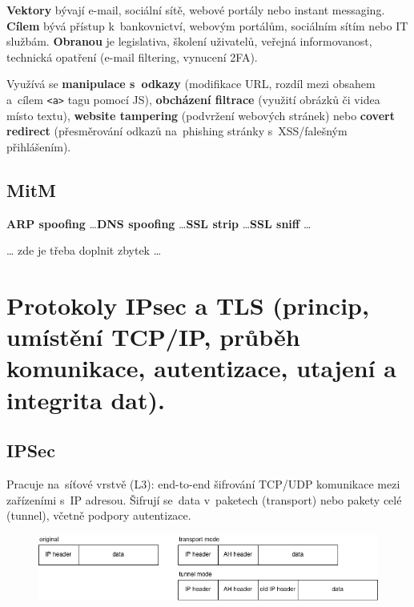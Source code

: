 \textbf{Vektory} bývají e-mail, sociální sítě, webové portály nebo instant messaging. \textbf{Cílem} bývá přístup k~bankovnictví, webovým portálům, sociálním sítím nebo IT službám. \textbf{Obranou} je legislativa, školení uživatelů, veřejná informovanost, technická opatření (e-mail filtering, vynucení 2FA).

Využívá se \textbf{manipulace s~odkazy} (modifikace URL, rozdíl mezi obsahem a~cílem \texttt{<a>} tagu pomocí JS), \textbf{obcházení filtrace} (využití obrázků či videa místo textu), \textbf{website tampering} (podvržení webových stránek) nebo \textbf{covert redirect} (přesměrování odkazů na~phishing stránky s~XSS/falešným přihlášením).

\subsection*{MitM}

\textbf{ARP spoofing} \dots \textbf{DNS spoofing} \dots \textbf{SSL strip} \dots \textbf{SSL sniff} \dots

\begin{center}
{\huge \dots} zde je třeba doplnit zbytek {\huge \dots}
\end{center}

\clearpage
\section{Protokoly IPsec a TLS (princip, umístění TCP/IP, průběh komunikace, autentizace, utajení a integrita dat).}

\subsection{IPSec}

Pracuje na~síťové vrstvě (L3): end-to-end šifrování TCP/UDP komunikace mezi zařízeními s~IP adresou. Šifrují se~data v~paketech (transport) nebo pakety celé (tunnel), včetně podpory autentizace.

\begin{figure}[ht]
\centering
\includegraphics[width=\textwidth]{images/ipsec}
\end{figure}

